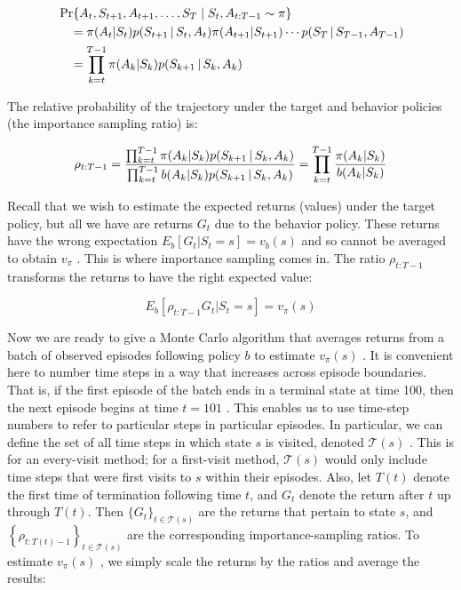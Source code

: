 \documentclass{article}
\begin{document}
$$
\begin{aligned} { } & { { } \operatorname* { P r } \{ A _ { t } , S _ { t + 1 } , A _ { t + 1 } , \ldots , S _ { T } \mid S _ { t } , A _ { t : T - 1 } \sim \pi \} } \\ { } & { { } \quad = \pi ( A _ { t } | S _ { t } ) p ( S _ { t + 1 } \thinspace \vert \thinspace S _ { t } , A _ { t } ) \pi ( A _ { t + 1 } | S _ { t + 1 } ) \cdots p ( S _ { T } \thinspace \vert \thinspace S _ { T - 1 } , A _ { T - 1 } ) } \\ { } & { { } \quad = \prod _ { k = t } ^ { T - 1 } \pi ( A _ { k } | S _ { k } ) p ( S _ { k + 1 } \thinspace \vert \thinspace S _ { k } , A _ { k } ) } \\ \end{aligned}
$$

The relative probability of the trajectory under the target and behavior policies (the importance sampling ratio) is:

$$
\rho _ { t : T - 1 } = \frac { \prod _ { k = t } ^ { T - 1 } \pi ( A _ { k } | S _ { k } ) p ( S _ { k + 1 } \thinspace | \thinspace S _ { k } , A _ { k } ) } { \prod _ { k = t } ^ { T - 1 } b ( A _ { k } | S _ { k } ) p ( S _ { k + 1 } \thinspace | \thinspace S _ { k } , A _ { k } ) } = \prod _ { k = t } ^ { T - 1 } \frac { \pi ( A _ { k } | S _ { k } ) } { b ( A _ { k } | S _ { k } ) }
$$

Recall that we wish to estimate the expected returns (values) under the target policy, but all we have are returns $G _ { t }$ 
due to the behavior policy. These returns have the wrong expectation $E _ b [ G _ { t } | S _ { t }   =   s ] = v _ { b } ( s )$ and so cannot be averaged 
to obtain $v _ { \pi }$ . This is where importance sampling comes in. The ratio $\rho _ { t : T - 1 }$ transforms the returns to have the right expected value:

$$
E _ b [ \rho _ { t : T - 1 } G _ { t } | S _ { t } \mathop { = } s ] = v _ { \pi } ( s )
$$

Now we are ready to give a Monte Carlo algorithm that averages returns from a batch of observed episodes following policy $ b $ 
to estimate $v _ { \pi } ( s )$ . It is convenient here to number time steps in a way that increases across episode boundaries. 
That is, if the first episode of the batch ends in a terminal state at time 100, then the next episode begins at time $t = 1 0 1$ . 
This enables us to use time-step numbers to refer to particular steps in particular episodes. In particular, we can define the set of all time steps 
in which state $ s $ is visited, denoted $ \mathcal { T } ( s )$ . This is for an every-visit method; for a first-visit method, 
${ \mathcal { T } } ( s )$ would only include time steps that were first visits to $ s $ within their episodes. Also, let $T ( t )$ denote 
the first time of termination following time $ t $, and $G _ { t }$ denote the return after $ t $ up through $T ( t )$. Then $\{ G _ { t } \} _ { t \in \mathcal { T } ( s ) }$ 
are the returns that pertain to state $ s $, and $\left\{ \rho _ { t : T ( t ) - 1 } \right\} _ { t \in \mathcal { T } ( s ) }$ are 
the corresponding importance-sampling ratios. To estimate $v _ { \pi } ( s )$ , we simply scale the returns by the ratios and average the results:
\end{document}
